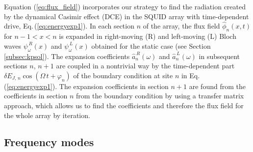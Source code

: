 \color{red}
Equation (\ref{eq:flux_field}) incorporates our strategy to find the radiation created by the 
dynamical Casimir effect (DCE) in the SQUID array with time-dependent drive, Eq.\,(\ref{eq:energyexp1}). 
In each section $n$ of the array, the flux field $\hat{\phi}_n(x,t)$ for $n-1 < x < n$
is expanded in 
right-moving (R) and left-moving (L) Bloch waves $\psi_{\omega}^{\,R}(x)$ and $\psi_{\omega}^{\,L}(x)$ 
obtained for the static case (see Section \ref{subsec:kpsol}). The expansion 
coefficients $\hat{a}_n^{\,R}(\omega)$ and $\hat{a}_n^{\,L}(\omega)$ 
in subsequent sections $n$, $n+1$ are coupled in a nontrivial way by the time-dependent 
part $\delta E_{J,\,n} \cos(\Omega \, t + \varphi_n)$ of the boundary condition at site $n$ in 
Eq.\,(\ref{eq:energyexp1}). 
The expansion coefficients in section $n+1$ are found from the coefficients in section $n$
from the boundary condition by using a transfer matrix approach, which allows us to find the 
coefficients and therefore the flux field for the whole array by iteration.
\color{black}


\subsection{Frequency modes}
\label{subsec:frequency_modes}

